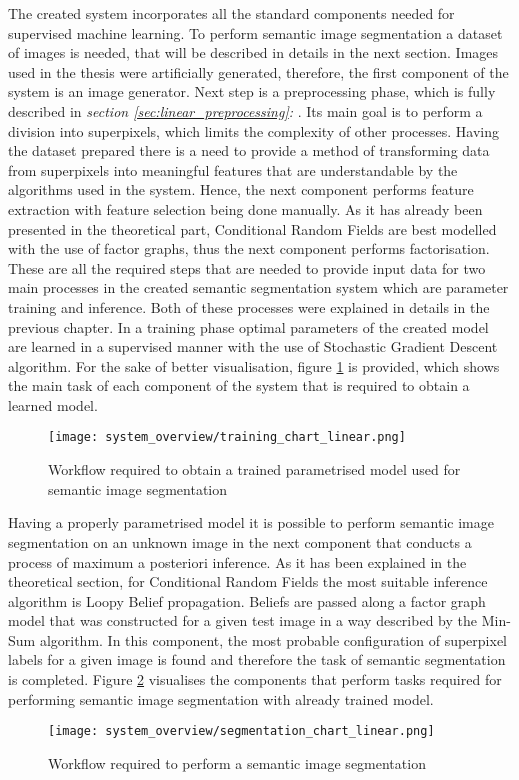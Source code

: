 The created system incorporates all the standard components needed for supervised machine learning. To perform semantic image segmentation a dataset of images is needed, that will be described in details in the next section. Images used in the thesis were artificially generated, therefore, the first component of the system is an image generator. Next step is a preprocessing phase, which is fully described in \textit{section \ref{sec:linear_preprocessing}: }. Its main goal is to perform a division into superpixels, which limits the complexity of other processes. Having the dataset prepared there is a need to provide a method of transforming data from superpixels into meaningful features that are understandable by the algorithms used in the system. Hence, the next component performs feature extraction with feature selection being done manually. As it has already been presented in the theoretical part, Conditional Random Fields are best modelled with the use of factor graphs, thus the next component performs factorisation. These are all the required steps that are needed to provide input data for two main processes in the created semantic segmentation system which are parameter training and inference. Both of these processes were explained in details in the previous chapter. In a training phase optimal parameters of the created model are learned in a supervised manner with the use of Stochastic Gradient Descent algorithm. For the sake of better visualisation, figure \ref{fig:training_chart_linear} is provided, which shows the main task of each component of the system that is required to obtain a learned model. 
\begin{figure}[ht]
    \centering
    \texttt{[image: system\_overview/training\_chart\_linear.png]}
    \caption{Workflow required to obtain a trained parametrised model used for semantic image segmentation}
     \label{fig:training_chart_linear}
\end{figure}
Having a properly parametrised model it is possible to perform semantic image segmentation on an unknown image in the next component that conducts a process of maximum a posteriori inference. As it has been explained in the theoretical section, for Conditional Random Fields the most suitable inference algorithm is Loopy Belief propagation. Beliefs are passed along a factor graph model that was constructed for a given test image in a way described by the Min-Sum algorithm. In this component, the most probable configuration of superpixel labels for a given image is found and therefore the task of semantic segmentation is completed. Figure \ref{fig:segmentation_chart_linear} visualises the components that perform tasks required for performing semantic image segmentation with already trained model.
\begin{figure}[ht]
    \centering
    \texttt{[image: system\_overview/segmentation\_chart\_linear.png]}
    \caption{Workflow required to perform a semantic image segmentation}
     \label{fig:segmentation_chart_linear}
\end{figure}

